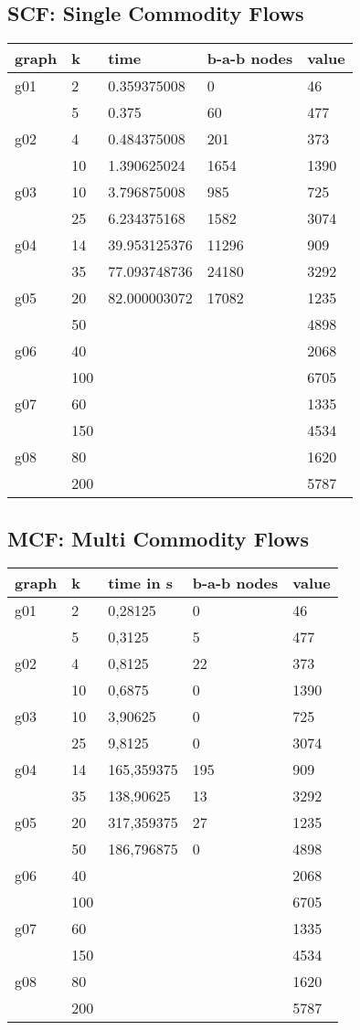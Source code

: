 \subsection{SCF: Single Commodity Flows}
\begin{tabular}{| l l l l l |}
graph	&	k	&	time		&	b-a-b nodes &	value	\\ \hline
g01	&	2	&	0.359375008	&	0	&	46	\\
	&	5	&	0.375		&	60	&	477	\\ \hline
g02	&	4	&	0.484375008	&	201	&	373	\\
	&	10	&	1.390625024	&	1654	&	1390	\\ \hline
g03	&	10	&	3.796875008	&	985	&	725	\\
	&	25	&	6.234375168	&	1582	&	3074	\\ \hline
g04	&	14	&	39.953125376	&	11296	&	909	\\
	&	35	&	77.093748736	&	24180	&	3292	\\ \hline
g05	&	20	&	82.000003072	&	17082	&	1235	\\
	&	50	&			&		&	4898	\\ \hline
g06	&	40	&			&		&	2068	\\
	&	100	&			&		&	6705	\\ \hline
g07	&	60	&			&		&	1335	\\
	&	150	&			&		&	4534	\\ \hline
g08	&	80	&			&		&	1620	\\
	&	200	&			&		&	5787	\\ \hline
\end{tabular}


\subsection{MCF: Multi Commodity Flows}
\begin{tabular}{| l l l l l |}
graph	&	k	&	time in s	&	b-a-b nodes &	value	\\ \hline
g01	&	2	&	0,28125 	&	0	&	46	\\
	&	5	&	0,3125 		&	5	&	477	\\ \hline
g02	&	4	&	0,8125 		&	22	&	373	\\
	&	10	&	0,6875 		&	0	&	1390	\\ \hline
g03	&	10	&	3,90625 	&	0	&	725	\\
	&	25	&	9,8125 		&	0	&	3074	\\ \hline
g04	&	14	&	165,359375 	&	195	&	909	\\
	&	35	&	138,90625 	&	13	&	3292	\\ \hline
g05	&	20	&	317,359375 	&	27	&	1235	\\
	&	50	&	186,796875 	&	0	&	4898	\\ \hline
g06	&	40	&			&		&	2068	\\
	&	100	&			&		&	6705	\\ \hline
g07	&	60	&			&		&	1335	\\
	&	150	&			&		&	4534	\\ \hline
g08	&	80	&			&		&	1620	\\
	&	200	&			&		&	5787	\\ \hline
\end{tabular}


